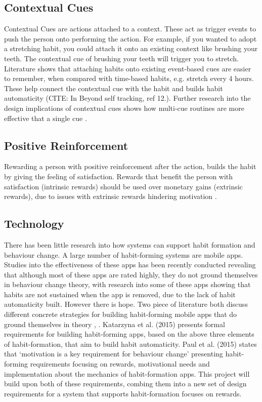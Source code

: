 \subsection*{Contextual Cues}
Contextual Cues are actions attached to a context. These act as trigger events to push the person onto performing the action. For example, if you wanted to adopt a stretching habit, you could attach it onto an existing context like brushing your teeth. The contextual cue of brushing your teeth will trigger you to stretch. Literature \cite{article_beyond_self_tracking_designing_apps} shows that attaching habits onto existing event-based cues are easier to remember, when compared with time-based habits, e.g. stretch every 4 hours. These help connect the contextual cue with the habit and builds habit automaticity (CITE: In Beyond self tracking, ref 12.). Further research into the design implications of contextual cues shows how multi-cue routines are more effective that a single cue \cite{article_understanding_use_contextual_cues_design_impl}.

\subsection*{Positive Reinforcement}
Rewarding a person with positive reinforcement after the action, builds the habit by giving the feeling of satisfaction. Rewards that benefit the person with satisfaction (intrinsic rewards) should be used over monetary gains (extrinsic rewards), due to issues with extrinsic rewards hindering motivation \cite{article_beyond_self_tracking_designing_apps}.

\subsection{Technology}
There has been little research into how systems can support habit formation and behaviour change. A large number of habit-forming systems are mobile apps. Studies into the effectiveness of these apps has been recently conducted \cite{article_beyond_self_tracking_designing_apps} revealing that although most of these apps are rated highly, they do not ground themselves in behaviour change theory, with research into some of these apps showing that habits are not sustained when the app is removed, due to the lack of habit automaticity built.\newline
\newline
However there is hope. Two piece of literature both discuss different concrete strategies for building habit-forming mobile apps that do ground themselves in theory \cite{article_beyond_self_tracking_designing_apps}, \cite{article_taxonomy_motivational_affordances_meaningful}. Katarzyna et al. (2015) presents formal requirements for building habit-forming apps, based on the above three elements of habit-formation, that aim to build habit automaticity. Paul et al. (2015) states that `motivation is a key requirement for behaviour change' presenting habit-forming requirements focusing on rewards, motivational needs and implementation about the mechanics of habit-formation apps. This project will build upon both of these requirements, combing them into a new set of design requirements for a system that supports habit-formation focuses on rewards.

